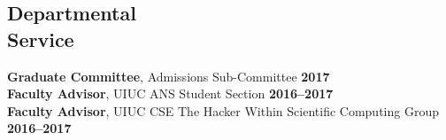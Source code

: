 \documentclass[margin,line]{resume}
\begin{document}
\begin{resume}
    \section{\mysidestyle Departmental\\Service}
		\textbf{Graduate Committee}, Admissions Sub-Committee \hfill \textbf{2017}\vspace{.5mm}\\%
		\textbf{Faculty Advisor}, UIUC ANS Student Section \hfill \textbf{2016--2017}\vspace{.5mm}\\%
		\textbf{Faculty Advisor}, UIUC CSE The Hacker Within Scientific Computing Group \hfill \textbf{2016--2017}\vspace{.5mm}\\%




\end{resume}
\end{document}
